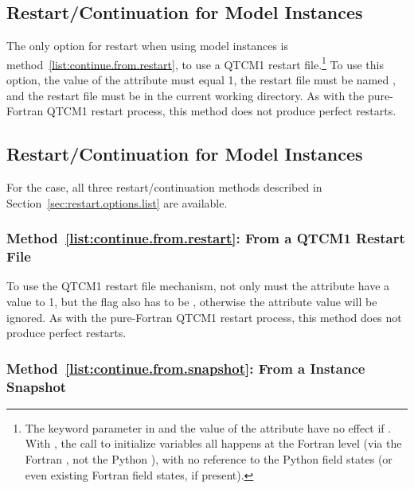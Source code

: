 	\subsection{Restart/Continuation for 
		Model Instances}

The only option for restart when using
 model instances
is method~\ref{list:continue.from.restart}, to use a QTCM1 restart
file.\footnote%
	{The  keyword parameter in 
	and the value of the 
	attribute have no effect if
	.  With
	, the call to initialize variables all happens
	at the Fortran level (via the Fortran , not
	the Python ), with no reference to the Python field
	states (or even existing Fortran field states, if present).}
To use this option, the value of the  
attribute must equal 1, the restart file must be named
, and the restart file must be in the 
current working directory.
As with the pure-Fortran QTCM1 restart process, this method
does not produce perfect restarts.



	\subsection{Restart/Continuation for 
		Model Instances}

For the  case,
all three restart/continuation methods
described in Section~\ref{sec:restart.options.list} are
available.


		\subsubsection{Method~\ref{list:continue.from.restart}:
			From a QTCM1 Restart File}

To use the QTCM1 restart file mechanism, not only must the
 attribute have a value to 1, but the
 flag also has to be ,
otherwise the  attribute value will be ignored.  
As with the pure-Fortran QTCM1 restart process, this method does not
produce perfect restarts.


		\subsubsection{Method~\ref{list:continue.from.snapshot}:
			From a  Instance Snapshot}

